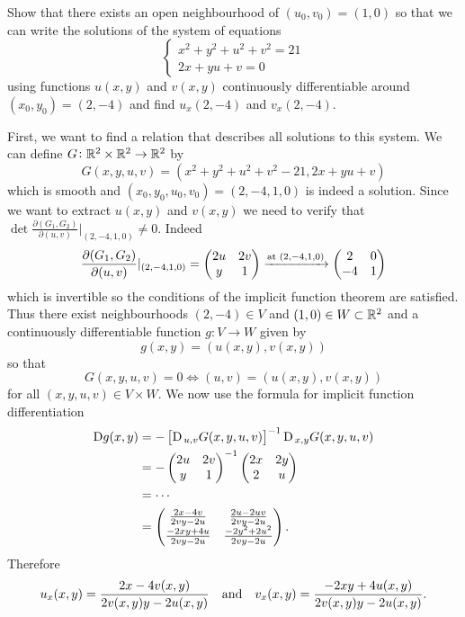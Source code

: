 \documentclass[11pt,a4paper]{article}
\begin{document}
\begin{exercise}
  Show that there exists an open neighbourhood of $(u_0,v_0) = (1,0)$
  so that we can write the solutions of the system of equations
  \[
    \begin{cases}
      x^2 + y^2 + u^2 + v^2 = 21 \\
      2x + yu + v = 0
    \end{cases}
  \]
  using functions $u(x,y)$ and $v(x,y)$ continuously differentiable
  around $(x_0,y_0) = (2,-4)$ and find $u_x(2,-4)$ and $v_x(2,-4)$.
\end{exercise}
\begin{solution}
  First, we want to find a relation that describes all solutions to
  this system.
  We can define $G \colon \mathbb{R}^{2} \times \mathbb{R}^{2} \to \mathbb{R}^2$ by
  \[
    G(x,y,u,v) = (x^2 + y^2 + u^2 + v^2 - 21, 2x + yu + v)
  \]
  which is smooth and $(x_0,y_0,u_0,v_0) = (2,-4,1,0)$
  is indeed a solution.
  Since we want to extract $u(x,y)$ and $v(x,y)$
  we need to verify that $\det
  \frac{\partial(G_1,G_2)}{\partial(u,v)}\vert_{(2,-4,1,0)} \neq 0$.
  Indeed
  \[
    \frac{\partial(G_1,G_2)}{\partial(u,v)}\vert_{(2,-4,1,0)} =
    \begin{pmatrix}
      2u & 2v \\
      y & 1
    \end{pmatrix} \xrightarrow{\text{at }(2,-4,1,0)}
    \begin{pmatrix}
      2 & 0 \\
      -4 & 1
    \end{pmatrix}
  \]
  which is invertible so the conditions of the implicit function
  theorem are satisfied.
  Thus there exist neighbourhoods $(2,-4) \in V$
  and $(1,0) \in W \subset \mathbb{R}^2$ and a continuously differentiable function
  $g \colon V \to W$ given by
  \[
    g(x,y) = (u(x,y),v(x,y))
  \]
  so that
  \[
    G(x,y,u,v) = 0 \iff (u,v) = (u(x,y),v(x,y))
  \]
  for all $(x,y,u,v) \in V \times W$.
  We now use the formula for implicit function differentiation
  \begin{align*}
    \mathrm{D} g(x,y) &=
    -\left[\mathrm{D}_{\,u,v} G(x,y,u,v)\right]^{-1} \mathrm{D}_{\,x,y} G(x,y,u,v) \\ &=
    -
    \begin{pmatrix}
      2u & 2v \\
      y & 1
    \end{pmatrix}^{-1}
    \begin{pmatrix}
      2x & 2y \\
      2 & u
    \end{pmatrix} \\ &= \cdots \\ &=
    \begin{pmatrix}
      \frac{2x - 4v}{2vy - 2u} & \frac{2u - 2uv}{2vy - 2u} \\
      \frac{-2xy + 4u}{2vy - 2u} & \frac{-2y^2 + 2u^2}{2vy - 2u}
    \end{pmatrix}.
  \end{align*}
  Therefore
  \[
    u_x(x,y) =
    \frac{2x - 4v(x,y)}{2v(x,y)y - 2u(x,y)} \quad \text{and} \quad
    v_x(x,y) = \frac{-2xy + 4u(x,y)}{2v(x,y)y - 2u(x,y)}.
  \]
\end{solution}
\end{document}

